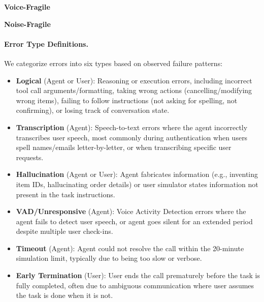 \begin{table}[h]
\caption{Qualitative error annotations for task completion failures. Left: Voice-Fragile cohort (43 simulations from Clean audio setting). Right: Noise-Fragile cohort (48 simulations from Realistic audio setting).}
\label{tab:full-notes-both}
\centering
\begin{small}
\begin{minipage}{0.48\textwidth}
\centering
\textbf{Voice-Fragile}\\[0.5em]

\end{minipage}
\hfill
\begin{minipage}{0.48\textwidth}
\centering
\textbf{Noise-Fragile}\\[0.5em]

\end{minipage}
\end{small}
\end{table}

\paragraph{Error Type Definitions.}
We categorize errors into six types based on observed failure patterns:

\begin{itemize}[nosep,leftmargin=*]
    \item \textbf{Logical} (Agent or User): Reasoning or execution errors, including incorrect tool call arguments/formatting, taking wrong actions (cancelling/modifying wrong items), failing to follow instructions (not asking for spelling, not confirming), or losing track of conversation state.
    
    \item \textbf{Transcription} (Agent): Speech-to-text errors where the agent incorrectly transcribes user speech, most commonly during authentication when users spell names/emails letter-by-letter, or when transcribing specific user requests.
    
    \item \textbf{Hallucination} (Agent or User): Agent fabricates information (e.g., inventing item IDs, hallucinating order details) or user simulator states information not present in the task instructions.
    
    \item \textbf{VAD/Unresponsive} (Agent): Voice Activity Detection errors where the agent fails to detect user speech, or agent goes silent for an extended period despite multiple user check-ins.
    
    \item \textbf{Timeout} (Agent): Agent could not resolve the call within the 20-minute simulation limit, typically due to being too slow or verbose.
    
    \item \textbf{Early Termination} (User): User ends the call prematurely before the task is fully completed, often due to ambiguous communication where user assumes the task is done when it is not.
\end{itemize}

